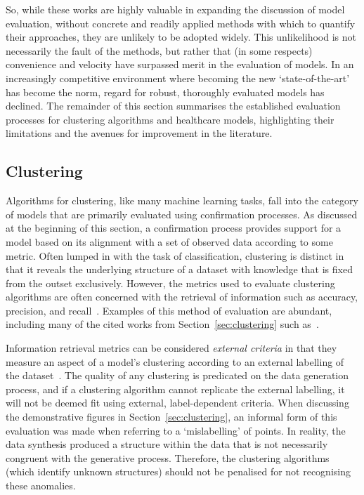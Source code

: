 So, while these works are highly valuable in expanding the discussion of model
evaluation, without concrete and readily applied methods with which to quantify
their approaches, they are unlikely to be adopted widely. This unlikelihood is
not necessarily the fault of the methods, but rather that (in some respects)
convenience and velocity have surpassed merit in the evaluation of models. In an
increasingly competitive environment where becoming the new `state-of-the-art'
has become the norm, regard for robust, thoroughly evaluated models has
declined. The remainder of this section summarises the established evaluation
processes for clustering algorithms and healthcare models, highlighting their
limitations and the avenues for improvement in the literature.

\subsection{Clustering}\label{subsec:clustering_evaluation}

Algorithms for clustering, like many machine learning tasks, fall into the
category of models that are primarily evaluated using confirmation processes. As
discussed at the beginning of this section, a confirmation process provides
support for a model based on its
alignment with a set of observed data according to some metric. Often lumped in
with the task of classification, clustering is distinct in that it reveals the
underlying structure of a dataset with knowledge that is fixed from the outset
exclusively. However, the metrics used to evaluate clustering algorithms are
often concerned with the retrieval of information such as accuracy, precision,
and recall~\cite{Manning2008}. Examples of this method of evaluation are
abundant, including many of the cited works from Section~\ref{sec:clustering}
such as~\cite{Agrawal1998,Aljarah2019,Bakr2015,Cao2009,Huang1998}.

Information retrieval metrics can be considered \emph{external criteria} in that
they measure an aspect of a model's clustering according to an external labelling
of the dataset~\cite{Mitchell1997}. The quality of any
clustering is predicated on the data generation process, and if a clustering
algorithm cannot replicate the external labelling, it will not be deemed fit
using external, label-dependent criteria. When discussing the demonstrative
figures in Section~\ref{sec:clustering}, an informal form of this evaluation
was made when referring to a `mislabelling' of points. In reality, the data
synthesis produced a structure within the data that is not necessarily congruent
with the generative process. Therefore, the clustering algorithms (which
identify unknown structures) should not be penalised for not recognising these
anomalies.

